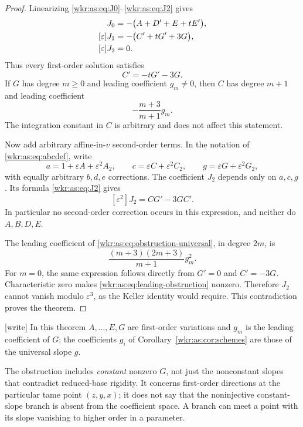 \documentclass[11pt,a4paper]{article}
\numberwithin{equation}{section}
\theoremstyle{definition}
\theoremstyle{remark}
\newcommand{\eps}{\varepsilon}
\begin{document}
\begin{proof}
Linearizing \eqref{wkr:as:eq:J0}--\eqref{wkr:as:eq:J2} gives
\begin{align}
[\eps]J_0&=-\bigl(A+D'+E+tE'\bigr),\label{wkr:as:eq:linear0}\\
[\eps]J_1&=-\bigl(C'+tG'+3G\bigr),\label{wkr:as:eq:linear1}\\
[\eps]J_2&=0.\notag
\end{align}
Thus every first-order solution satisfies
\begin{equation}\label{wkr:as:eq:Cconstraint}
C'=-tG'-3G.
\end{equation}
If $G$ has degree $m\ge0$ and leading coefficient $g_m\ne0$, then $C$
has degree $m+1$ and leading coefficient
\[
-\frac{m+3}{m+1}g_m.
\]
The integration constant in $C$ is arbitrary and does not affect this
statement.

Now add arbitrary affine-in-$v$ second-order terms. In the notation of
\eqref{wkr:as:eq:abcdef}, write
\[
a=1+\eps A+\eps^2A_2,\qquad
c=\eps C+\eps^2C_2,\qquad
g=\eps G+\eps^2G_2,
\]
with equally arbitrary $b,d,e$ corrections. The coefficient $J_2$ depends
only on $a,c,g$. Its formula \eqref{wkr:as:eq:J2} gives
\begin{equation}\label{wkr:as:eq:obstruction-universal}
[\eps^2]J_2=CG'-3GC'.
\end{equation}
In particular no second-order correction occurs in this expression, and
neither do $A,B,D,E$.

The leading coefficient of \eqref{wkr:as:eq:obstruction-universal}, in
degree $2m$, is
\begin{equation}\label{wkr:as:eq:leading-obstruction}
\frac{(m+3)(2m+3)}{m+1}g_m^2.
\end{equation}
For $m=0$, the same expression follows directly from $G'=0$ and
$C'=-3G$. Characteristic zero makes \eqref{wkr:as:eq:leading-obstruction}
nonzero. Therefore $J_2$ cannot vanish modulo $\eps^3$, as the Keller
identity would require. This contradiction proves the theorem.
\end{proof}
\noindent\textup{[write]} In this theorem $A,\ldots,E,G$ are first-order
variations and $g_m$ is the leading coefficient of $G$; the coefficients
$g_i$ of Corollary~\ref{wkr:as:cor:schemes} are those of the universal
slope $g$.

The obstruction includes \emph{constant} nonzero $G$, not just the
nonconstant slopes that contradict reduced-base rigidity. It concerns
first-order directions at the particular tame point $(z,y,x)$; it does
not say that the noninjective constant-slope branch is absent from the
coefficient space. A branch can meet a point with its slope vanishing to
higher order in a parameter.
\end{document}
